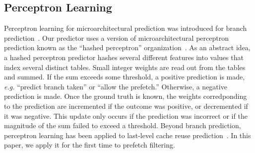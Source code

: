 \subsection{Perceptron Learning}
\label{sec:Background-Perceptron}
Perceptron learning for microarchitectural prediction was introduced for
branch prediction~\cite{PerceptronPredictor}. Our predictor uses a version of
microarchitectural perceptron prediction known as the ``hashed perceptron''
organization~\cite{HashedPerceptron}. As an abstract idea, a hashed perceptron
predictor hashes several different features into values that index several
distinct tables. Small integer weights are read out from the tables and
summed. If the sum exceeds some threshold, a positive prediction is made, {\em
e.g.} ``predict branch taken'' or ``allow the prefetch.'' Otherwise, a
negative prediction is made. Once the ground truth is known, the weights
corredponding to the prediction are incremented if the outcome was positive,
or decremented if it was negative. This update only occurs if the prediction
was incorrect or if the magnitude of the sum failed to exceed a threshold.
Beyond branch prediction, perceptron learning has been applied to last-level
cache reuse prediction~\cite{Perc_Reuse,Multiperspective}. In this paper, we
apply it for the first time to prefetch filtering.





